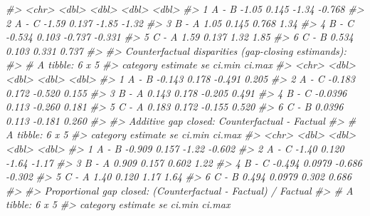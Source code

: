 \documentclass[
]{article}
\newenvironment{Shaded}{\begin{snugshade}}{\end{snugshade}}
\newcommand{\CommentTok}[1]{\textcolor[rgb]{0.56,0.35,0.01}{\textit{#1}}}
\begin{document}
\begin{Shaded}
\begin{Highlighting}[]
\CommentTok{\#\textgreater{}   \textless{}chr\textgreater{}       \textless{}dbl\textgreater{} \textless{}dbl\textgreater{}  \textless{}dbl\textgreater{}  \textless{}dbl\textgreater{}}
\CommentTok{\#\textgreater{} 1 A {-} B      {-}1.05  0.145 {-}1.34  {-}0.768}
\CommentTok{\#\textgreater{} 2 A {-} C      {-}1.59  0.137 {-}1.85  {-}1.32 }
\CommentTok{\#\textgreater{} 3 B {-} A       1.05  0.145  0.768  1.34 }
\CommentTok{\#\textgreater{} 4 B {-} C      {-}0.534 0.103 {-}0.737 {-}0.331}
\CommentTok{\#\textgreater{} 5 C {-} A       1.59  0.137  1.32   1.85 }
\CommentTok{\#\textgreater{} 6 C {-} B       0.534 0.103  0.331  0.737}
\CommentTok{\#\textgreater{} }
\CommentTok{\#\textgreater{} Counterfactual disparities (gap{-}closing estimands):}
\CommentTok{\#\textgreater{} \# A tibble: 6 x 5}
\CommentTok{\#\textgreater{}   category estimate    se ci.min ci.max}
\CommentTok{\#\textgreater{}   \textless{}chr\textgreater{}       \textless{}dbl\textgreater{} \textless{}dbl\textgreater{}  \textless{}dbl\textgreater{}  \textless{}dbl\textgreater{}}
\CommentTok{\#\textgreater{} 1 A {-} B     {-}0.143  0.178 {-}0.491  0.205}
\CommentTok{\#\textgreater{} 2 A {-} C     {-}0.183  0.172 {-}0.520  0.155}
\CommentTok{\#\textgreater{} 3 B {-} A      0.143  0.178 {-}0.205  0.491}
\CommentTok{\#\textgreater{} 4 B {-} C     {-}0.0396 0.113 {-}0.260  0.181}
\CommentTok{\#\textgreater{} 5 C {-} A      0.183  0.172 {-}0.155  0.520}
\CommentTok{\#\textgreater{} 6 C {-} B      0.0396 0.113 {-}0.181  0.260}
\CommentTok{\#\textgreater{} }
\CommentTok{\#\textgreater{} Additive gap closed: Counterfactual {-} Factual}
\CommentTok{\#\textgreater{} \# A tibble: 6 x 5}
\CommentTok{\#\textgreater{}   category estimate     se ci.min ci.max}
\CommentTok{\#\textgreater{}   \textless{}chr\textgreater{}       \textless{}dbl\textgreater{}  \textless{}dbl\textgreater{}  \textless{}dbl\textgreater{}  \textless{}dbl\textgreater{}}
\CommentTok{\#\textgreater{} 1 A {-} B      {-}0.909 0.157  {-}1.22  {-}0.602}
\CommentTok{\#\textgreater{} 2 A {-} C      {-}1.40  0.120  {-}1.64  {-}1.17 }
\CommentTok{\#\textgreater{} 3 B {-} A       0.909 0.157   0.602  1.22 }
\CommentTok{\#\textgreater{} 4 B {-} C      {-}0.494 0.0979 {-}0.686 {-}0.302}
\CommentTok{\#\textgreater{} 5 C {-} A       1.40  0.120   1.17   1.64 }
\CommentTok{\#\textgreater{} 6 C {-} B       0.494 0.0979  0.302  0.686}
\CommentTok{\#\textgreater{} }
\CommentTok{\#\textgreater{} Proportional gap closed: (Counterfactual {-} Factual) / Factual}
\CommentTok{\#\textgreater{} \# A tibble: 6 x 5}
\CommentTok{\#\textgreater{}   category estimate    se ci.min ci.max}

\end{Highlighting}
\end{Shaded}
\end{document}

